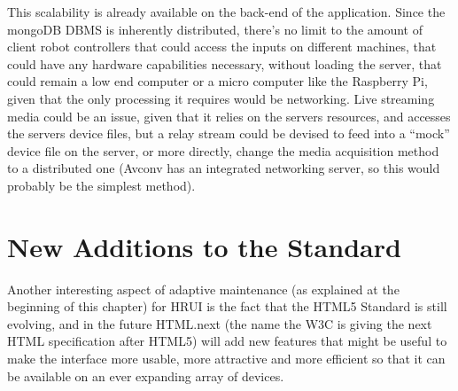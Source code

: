 This scalability is already available on the back-end of the application. Since the mongoDB DBMS is inherently distributed, there's 
no limit to the amount of client robot controllers that could access the inputs on different machines, that could have any hardware 
capabilities necessary, without loading the server, that could remain a low end computer or a micro computer like the Raspberry Pi, 
given that the only processing it requires would be networking. Live streaming media could be an issue, given that it relies on the 
servers resources, and accesses the servers device files, but a relay stream could be devised to feed into a ``mock'' device file 
on the server, or more directly, change the media acquisition method to a distributed one (Avconv has an integrated networking 
server, so this would probably be the simplest method).
\section{New Additions to the Standard} \label{newadditionstothestandard}
Another interesting aspect of adaptive maintenance (as explained at the beginning of this chapter) for HRUI is the fact that the 
HTML5 Standard is still evolving, and in the future HTML.next (the name the W3C is giving the next HTML specification after HTML5) 
will add new features that might be useful to make the interface more usable, more attractive and more efficient so that it can be 
available on an ever expanding array of devices.\\

